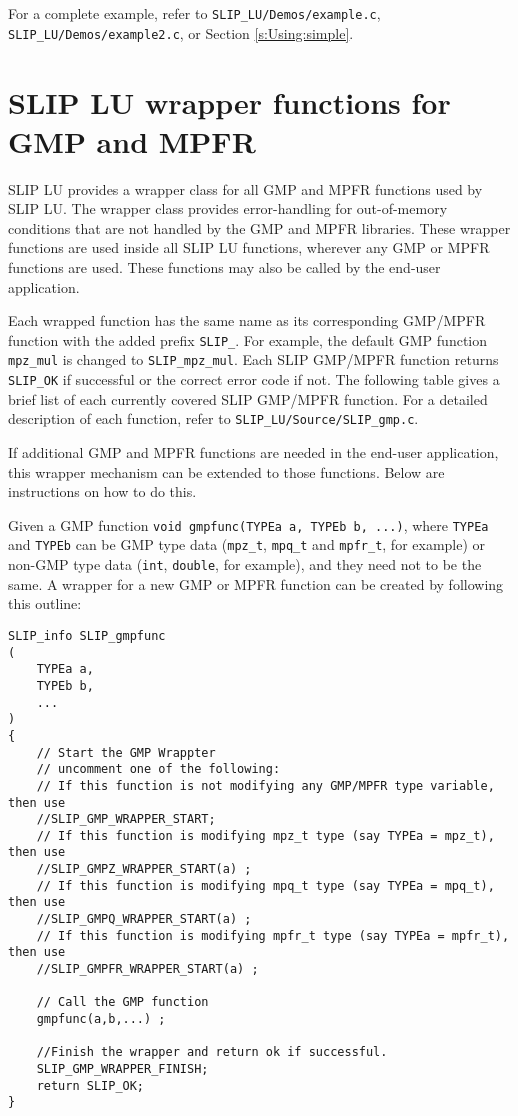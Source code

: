 \documentclass[12pt]{article}
\theoremstyle{definition}
\begin{document}
For a complete example, refer to \verb|SLIP_LU/Demos/example.c|,  \\
\verb|SLIP_LU/Demos/example2.c|, or Section \ref{s:Using:simple}.

\section{SLIP LU wrapper functions for GMP and MPFR}

SLIP LU provides a wrapper class for all GMP and MPFR functions used by SLIP
LU.  The wrapper class provides error-handling for out-of-memory conditions
that are not handled by the GMP and MPFR libraries.  These wrapper functions
are used inside all SLIP LU functions, wherever any GMP or MPFR functions are
used.  These functions may also be called by the end-user application.

Each wrapped function has the same name as its corresponding GMP/MPFR function
with the added prefix \verb|SLIP_|. For example, the default GMP function
\verb|mpz_mul| is changed to \verb|SLIP_mpz_mul|. Each SLIP GMP/MPFR function
returns \verb|SLIP_OK| if successful or the correct error code if not. The
following table gives a brief list of each currently covered SLIP GMP/MPFR
function. For a detailed description of each function, refer to
\verb|SLIP_LU/Source/SLIP_gmp.c|.

If additional GMP and MPFR functions are needed in the end-user application,
this wrapper mechanism can be extended to those functions.  Below are
instructions on how to do this.

Given a GMP function \verb|void gmpfunc(TYPEa a, TYPEb b, ...)|, where
\verb|TYPEa| and \verb|TYPEb| can be GMP type data (\verb|mpz_t|,
\verb|mpq_t| and \verb|mpfr_t|, for example) or non-GMP type data (\verb|int|,
\verb|double|, for example), and they need not to be the same.
A wrapper for a new GMP or MPFR function can be created by following
this outline:

\begin{mdframed}[userdefinedwidth=6in]
{\footnotesize
\begin{verbatim}
SLIP_info SLIP_gmpfunc
(
    TYPEa a,
    TYPEb b,
    ...
)
{
    // Start the GMP Wrappter
    // uncomment one of the following:
    // If this function is not modifying any GMP/MPFR type variable, then use
    //SLIP_GMP_WRAPPER_START;
    // If this function is modifying mpz_t type (say TYPEa = mpz_t), then use
    //SLIP_GMPZ_WRAPPER_START(a) ;
    // If this function is modifying mpq_t type (say TYPEa = mpq_t), then use
    //SLIP_GMPQ_WRAPPER_START(a) ;
    // If this function is modifying mpfr_t type (say TYPEa = mpfr_t), then use
    //SLIP_GMPFR_WRAPPER_START(a) ;

    // Call the GMP function
    gmpfunc(a,b,...) ;

    //Finish the wrapper and return ok if successful.
    SLIP_GMP_WRAPPER_FINISH;
    return SLIP_OK;
}
\end{verbatim}
} \end{mdframed}
\end{document}
